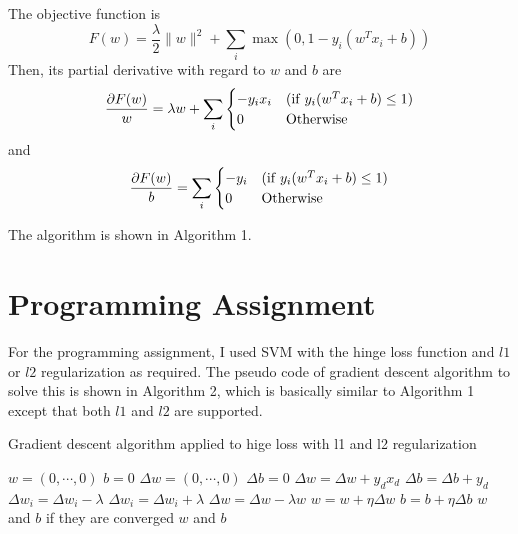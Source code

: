 \begin{enumerate}
\begin{enumerate}
The objective function is
\[
F(w)=\frac{\lambda}{2}\|w\|^2+\sum_i \max{(0, 1-y_i (w^Tx_i+b))}
\]
Then, its partial derivative with regard to $w$ and $b$ are
\[
\frac{\partial F(w)}{w}=\lambda w+ \sum_i
\begin{cases}
-y_i x_i & ({\rm if} \; y_i(w^Tx_i+b) \le 1) \\
0 & {\rm Otherwise}
\end{cases}
\]
and
\[
\frac{\partial F(w)}{b}=\sum_i
\begin{cases}
-y_i & ({\rm if} \; y_i(w^Tx_i+b) \le 1) \\
0 & {\rm Otherwise}
\end{cases}
\]

The algorithm is shown in Algorithm 1.

\end{enumerate}

\end{enumerate}

\section{Programming Assignment}

For the programming assignment, I used SVM with the hinge loss function and $l1$ or $l2$ regularization as required. The pseudo code of gradient descent algorithm to solve this is shown in Algorithm 2, which is basically similar to Algorithm 1 except that both $l1$ and $l2$ are supported.

\begin{algorithm}
\caption{Gradient descent algorithm applied to hige loss with l1 and l2 regularization}\label{euclid}
\begin{algorithmic}[1]
\State $w=(0, \cdots, 0)$
\State $b=0$
\State $\Delta w=(0, \cdots, 0)$
\State $\Delta b=0$
\State $\Delta w= \Delta w+y_d x_d$
\State $\Delta b=\Delta b+y_d$
\EndIf
\EndFor
{}
\State $\Delta w_i=\Delta w_i-\lambda$
\Else
\State $\Delta w_i=\Delta w_i+\lambda$
\EndIf
\EndFor
{}
\State $\Delta w=\Delta w - \lambda w$
\EndIf
\State $w=w+\eta \Delta w$
\State $b=b+\eta \Delta b$
\State \Return $w$ and $b$ if they are converged
\EndFor
\State \Return $w$ and $b$
\EndProcedure
\end{algorithmic}
\end{algorithm}

